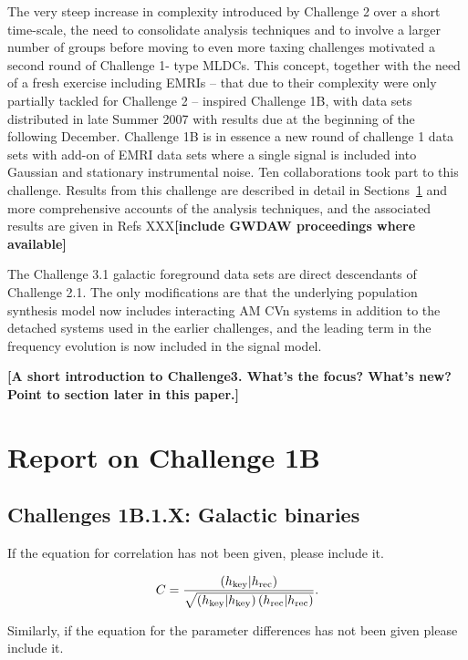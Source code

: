 \documentclass{iopart}
\begin{document}
The very steep increase in complexity introduced by Challenge 2 over a short time-scale, the need to consolidate analysis techniques and to involve a larger number of groups before moving to even more taxing challenges motivated a second round of Challenge 1- type MLDCs. This concept, together with the need of a fresh exercise including EMRIs -- that due to their complexity were only partially tackled for Challenge 2 -- inspired Challenge 1B, with data sets distributed in late Summer 2007 with results due at the beginning of the following December. Challenge 1B is in essence a new round of challenge 1 data sets with add-on of EMRI data sets where a single signal is included into Gaussian and stationary instrumental noise. Ten collaborations took part to this challenge. Results from this challenge are described in detail in Sections~\ref{s:challenge-1b} and more comprehensive accounts of the analysis techniques, and the associated results are given in Refs XXX\textbf{[include GWDAW proceedings where available]}

The Challenge 3.1 galactic foreground data sets are direct descendants of Challenge 2.1.
The only modifications are that the underlying population synthesis model now includes interacting
AM CVn systems in addition to the detached systems used in the earlier
challenges, and the leading term in the frequency evolution is now
included in the signal model.

\textbf{[A short introduction to Challenge3. What's the focus? What's new? Point to section later in this paper.]}

\section{Report on Challenge 1B}
\label{s:challenge-1b}

\subsection{Challenges 1B.1.X: Galactic binaries}

If the equation for correlation has not been given, please include it.

\begin{equation}
\label{cor}
C = \frac{\left(h_{\rm key}|h_{\rm rec}\right)}{\sqrt{\left(h_{\rm key}|h_{\rm key}\right)\left(h_{\rm rec}|h_{\rm rec}\right)}}.
\end{equation}

Similarly, if the equation for the parameter differences has not been given please include it.
\end{document}
